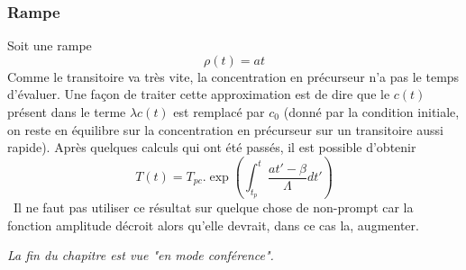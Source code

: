 \subsubsection{Rampe}
Soit une rampe
\begin{equation}
\rho(t) = at
\end{equation}
Comme le transitoire va très vite, la concentration en précurseur n'a pas le temps d'évaluer. Une 
façon de traiter cette approximation est de dire que le $c(t)$ présent dans le terme $\lambda c(t)$
est remplacé par $c_0$ (donné par la condition initiale, on reste en équilibre sur la concentration 
en précurseur sur un transitoire aussi rapide). Après quelques calculs qui ont été passés, il est 
possible d'obtenir
\begin{equation}
T(t) = {T_{pc}}.\exp \left( {\int_{{t_p}}^t   \frac{{at' - \beta }}{\Lambda }dt'} \right)
\end{equation}
\danger\ Il ne faut pas utiliser ce résultat sur quelque chose de non-prompt car la fonction 
amplitude décroit alors qu'elle devrait, dans ce cas la, augmenter.\\


\begin{center}
\textit{La fin du chapitre est vue "en mode conférence".}
\end{center}